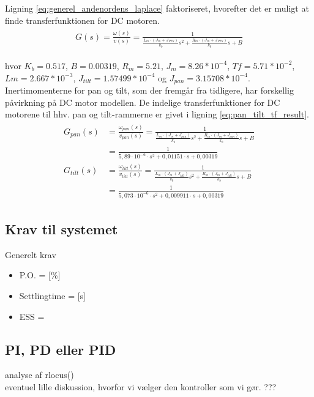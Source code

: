 Ligning \ref{eq:generel_andenordens_laplace} faktoriseret, hvorefter det er muligt at finde transferfunktionen for DC motoren. 
\begin{align}
\begin{split}
G\left( s \right) =\frac { \omega \left( s \right)  }{ v\left( s \right)  } =\frac { 1 }{ \frac { { L }_{ m }\cdot \left( { J }_{ m }+{ J }_{ PTS } \right)  }{ { k }_{ b } } { s }^{ 2 }+\frac { { R }_{ m }\cdot \left( { J }_{ m }+{ J }_{ PTS } \right)  }{ { k }_{ b } } s+B } 
\label{eq:generel_tf}
\end{split}
\end{align}

hvor 
\(K_b = 0.517\), \(B=0.00319\), \(R_m=5.21\), \(J_m=8.26*10^{-4}\), \(Tf=5.71*10^{-2}\), \(Lm=2.667*10^{-3}\), \(J_{tilt}=1.57499*10^{-4}\) og \(J_{pan}=3.15708*10^{-4}\).\\
Inertimomenterne for pan og tilt, som der fremgår fra tidligere, har forskellig påvirkning på DC motor modellen. De indelige transferfunktioner for DC motorene til hhv. pan og tilt-rammerne er givet i ligning \ref{eq:pan_tilt_tf_result}. 
\begin{align}
\begin{split}
G_{ pan }\left( s \right) &=\frac { \omega _{ pan }\left( s \right)  }{ v_{ pan }\left( s \right)  } =\frac { 1 }{ \frac { { L }_{ m }\cdot  \left( { J }_{ m }+{ J }_{ pan } \right) }{ { k }_{ b } } { s }^{ 2 }+\frac { { R }_{ m }\cdot  \left( { J }_{ m }+{ J }_{ pan } \right) }{ { k }_{ b } } s+B } 
\\
&=\frac { 1 }{ 5,89\cdot { 10 }^{ -6 }\cdot { s }^{ 2 }+0,01151\cdot s+0,00319 } 
\\
G_{ tilt }\left( s \right) &=\frac { \omega _{ tilt }\left( s \right)  }{ v_{ tilt }\left( s \right)  } =\frac { 1 }{ \frac { { L }_{ m }\cdot  \left( { J }_{ m }+{ J }_{ tilt } \right) }{ { k }_{ b } } { s }^{ 2 }+\frac { { R }_{ m }\cdot \left( { J }_{ m }+{ J }_{ tilt } \right) }{ { k }_{ b } } s+B } 
\\
&= \frac { 1 }{ 5,073\cdot { 10 }^{ -6 }\cdot { s }^{ 2 }+0,009911\cdot s+0,00319 } 
\label{eq:pan_tilt_tf_result}
\end{split}
\end{align}

\subsection{Krav til systemet}
Generelt krav
\begin{itemize}
\item P.O. = [\%]
\item Settlingtime = [s]
\item ESS = 
\end{itemize}


\subsection{PI, PD eller PID}
analyse af rlocus()\\
eventuel lille diskussion, hvorfor vi vælger den kontroller som vi gør. 
???